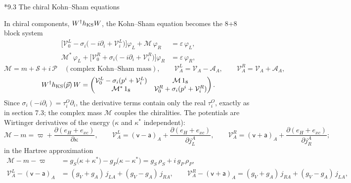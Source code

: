 \documentclass[10pt,a4paper]{article}
\makeatletter
\renewcommand\subsection{\@startsection{subsection}{2}{\z@}{-3.25ex\@plus -1ex \@minus -.2ex}{1.5ex \@plus .2ex}{\normalfont\large\bfseries\raggedright}}
\makeatother
\begin{document}
\subsection*{9.3 The chiral Kohn–Sham equations}
In chiral components, $W^\dagger h_{\rm KS}W$, the Kohn–Sham equation becomes the 8+8 block system
\begin{align*}
\big[\mathcal V^L_0-\sigma_i\big(-i\partial_i+\mathcal V^L_i\big)\big]\varphi_L+\mathcal M\,\varphi_R&=\varepsilon\,\varphi_L, \\
\mathcal M^*\,\varphi_L+\big[\mathcal V^R_0+\sigma_i\big(-i\partial_i+\mathcal V^R_i\big)\big]\varphi_R&=\varepsilon\,\varphi_R,
\end{align*}
\begin{equation*}
\mathcal M=m+\mathcal S+i\,\mathcal P\quad(\text{complex Kohn–Sham mass}),\qquad \mathcal V^L_A=\mathcal V_A-\mathcal A_A,\qquad \mathcal V^R_A=\mathcal V_A+\mathcal A_A,
\end{equation*}
\begin{equation*}
W^\dagger h_{\rm KS}(\vec p)\,W=\begin{pmatrix}\mathcal V^L_0-\sigma_i(p^i+\mathcal V^L_i)&\mathcal M\,1_8\\ \mathcal M^*\,1_8&\mathcal V^R_0+\sigma_i(p^i+\mathcal V^R_i)\end{pmatrix}.
\end{equation*}
Since $\sigma_i(-i\partial_i)=\tau^{O}_i\partial_i$, the derivative terms contain only the real $\tau^{O}_i$, exactly as in section 7.3; the complex mass $\mathcal M$ couples the chiralities. The potentials are Wirtinger derivatives of the energy ($\kappa$ and $\kappa^*$ independent):
\begin{equation*}
\mathcal M-m=\varpi+\frac{\partial(e_H+e_{xc})}{\partial\kappa},\qquad \mathcal V^L_A=(\mathsf v-\mathsf a)_A+\frac{\partial(e_H+e_{xc})}{\partial j_L^A},\qquad \mathcal V^R_A=(\mathsf v+\mathsf a)_A+\frac{\partial(e_H+e_{xc})}{\partial j_R^A};
\end{equation*}
in the Hartree approximation
\begin{align*}
\mathcal M-m-\varpi&=g_S\big(\kappa+\kappa^*\big)-g_P\big(\kappa-\kappa^*\big)=g_S\,\rho_S+i\,g_P\,\rho_P, \\
\mathcal V^L_A-(\mathsf v-\mathsf a)_A&=(g_V+g_A)\,j_{LA}+(g_V-g_A)\,j_{RA},\qquad \mathcal V^R_A-(\mathsf v+\mathsf a)_A=(g_V+g_A)\,j_{RA}+(g_V-g_A)\,j_{LA},
\end{align*}
\end{document}
